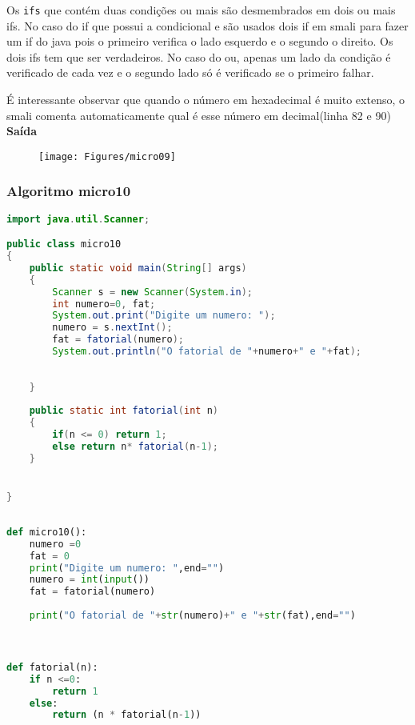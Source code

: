 \documentclass[hidelinks,12pt]{article}
\begin{document}
	Os \texttt{ifs} que contém duas condições ou mais são desmembrados em dois ou mais ifs. No caso do if que possui a condicional e são usados dois if em smali para fazer um if do java pois o primeiro verifica o lado esquerdo e o segundo o direito. Os dois ifs tem que ser verdadeiros. No caso do ou, apenas um lado da condição é verificado de cada vez e o segundo lado só é verificado se o primeiro falhar.
	
	É interessante observar que quando o número em hexadecimal é muito extenso, o smali comenta automaticamente qual é esse número em decimal(linha 82 e 90)\\
	
	{\large{\textbf{Saída}}}
	
	\begin{figure}[!h]
		\centering
		\texttt{[image: Figures/micro09]}
	\end{figure}
	
	\newpage
	
	\subsubsection{Algoritmo micro10}
	
	\begin{lstlisting}[caption=Código em Java,language=java]
import java.util.Scanner;

public class micro10
{
	public static void main(String[] args)
	{
		Scanner s = new Scanner(System.in);
		int numero=0, fat;
		System.out.print("Digite um numero: ");
		numero = s.nextInt();
		fat = fatorial(numero);
		System.out.println("O fatorial de "+numero+" e "+fat);
		
		
	}
		
	public static int fatorial(int n)
	{
		if(n <= 0) return 1;
		else return n* fatorial(n-1);
	}


}	
	
	\end{lstlisting}
	
	\begin{lstlisting}[caption=Código em python,language=Python]
def micro10():
	numero =0
	fat = 0
	print("Digite um numero: ",end="")
	numero = int(input())
	fat = fatorial(numero)
	
	print("O fatorial de "+str(numero)+" e "+str(fat),end="")



def fatorial(n):
	if n <=0:
		return 1
	else:
		return (n * fatorial(n-1))	
	
	\end{lstlisting}
	
\end{document}
